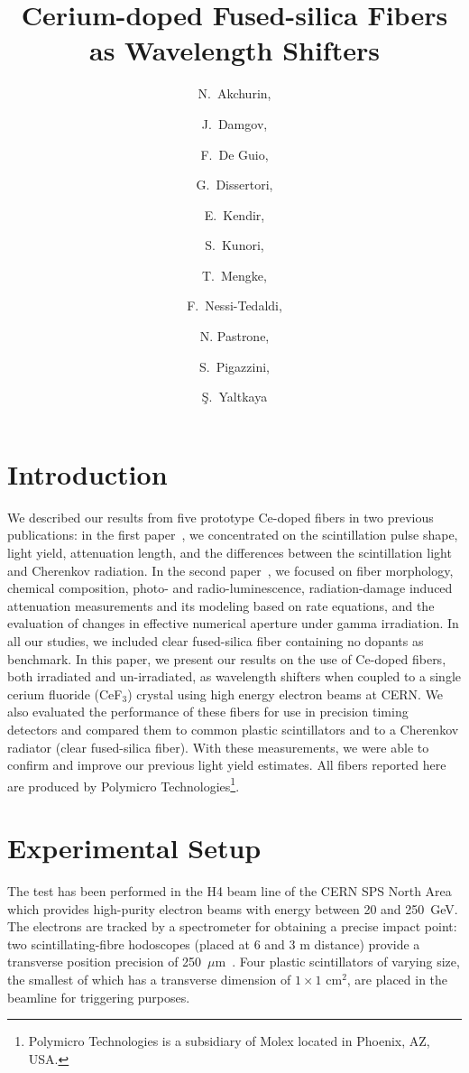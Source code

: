 \documentclass[a4paper,11pt]{article}
\title{\boldmath  Cerium-doped Fused-silica Fibers
as Wavelength Shifters}
\author[a,1]{N.~Akchurin,\note{Corresponding author.}}
\author[a]{J.~Damgov,}
\author[a]{F.~De Guio,}
\author[c]{G.~Dissertori,}
\author[b]{E.~Kendir,}
\author[a]{S.~Kunori,}
\author[a]{T.~Mengke,}
\author[c]{F.~Nessi-Tedaldi,}
\author[d]{N. Pastrone,}
\author[c]{S.~Pigazzini,}
\author[b]{\c{S}.~Yaltkaya}
\affiliation[a]{Texas Tech University, Department of Physics and Astronomy,  Lubbock, TX, 79409, USA}
\affiliation[b]{Akdeniz University, Department of Physics, Antalya, 07070, Turkey}
\affiliation[c]{ETH, Z\"urich, Switzerland}
\affiliation[d]{INFN-Torino, Italy}
\begin{document}
\maketitle
\flushbottom


\section{Introduction}
\label{sec:intro}
We described our results from five prototype Ce-doped fibers in two previous publications:  in the first paper~\cite{JINSTPaper}, we concentrated on the scintillation pulse shape, light yield, attenuation length, and the differences between the scintillation light and Cherenkov radiation.  In the second paper~\cite{JINSTPaper2}, we focused on fiber morphology, chemical composition, photo- and radio-luminescence, radiation-damage induced attenuation measurements and its modeling based on rate equations, and the evaluation of changes in effective numerical aperture under gamma irradiation.   In all our studies, we included clear fused-silica fiber containing no dopants  as benchmark. In this paper, we present our results on the use of Ce-doped fibers, both irradiated and un-irradiated, as wavelength shifters when coupled to a single cerium fluoride (CeF$_3$) crystal using high energy electron beams at CERN.  We also evaluated the performance of these fibers for use in precision timing detectors and compared them to common plastic scintillators and to a Cherenkov radiator (clear fused-silica fiber).  With these measurements, we were able to confirm and improve our previous light yield estimates.  All fibers reported here are produced by Polymicro Technologies\footnote{Polymicro Technologies is a subsidiary of Molex located in Phoenix, AZ, USA.}.

\section{Experimental Setup}
\label{sec:experimentalsetup}


The test has been performed in the H4 beam line of the CERN SPS North Area which provides high-purity electron beams with energy between 20 and 250~GeV. The electrons are tracked by a spectrometer for obtaining a precise impact point: two scintillating-fibre hodoscopes (placed at 6 and 3 m distance) provide a transverse position precision of 250~$\mu$m~\cite{r-SPA}.
Four plastic scintillators of varying size, the smallest of which has a transverse dimension of $1 \times 1$ cm$^2$, are placed in the beamline for triggering purposes.
\end{document}
